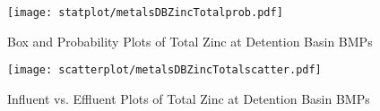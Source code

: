         \begin{figure}[hb]   %
            \centering
            \texttt{[image: statplot/metalsDBZincTotalprob.pdf]}
            \caption{Box and Probability Plots of Total Zinc at Detention Basin BMPs}
        \end{figure}         %
        
        
        \begin{figure}[hb]   %
            \centering
            \texttt{[image: scatterplot/metalsDBZincTotalscatter.pdf]}
            \caption{Influent vs. Effluent Plots of Total Zinc at Detention Basin BMPs}
        \end{figure}         %
        \clearpage
        